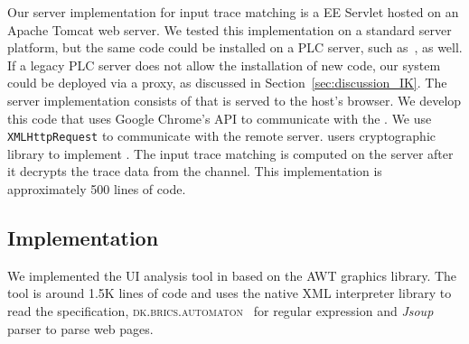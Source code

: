 Our server implementation for input trace matching is a \java EE Servlet hosted on an Apache Tomcat web server. We tested this implementation on a standard server platform, but the same code could be installed on a PLC server, such as~\cite{controlbyweb,siemens,siemens2,schneider}, as well. If a legacy PLC server does not allow the installation of new code, our system could be deployed via a proxy, as discussed in Section~\ref{sec:discussion_IK}. The server implementation consists of \js that is served to the host's browser. We develop this \js code that uses Google Chrome's \webusb API to communicate with the \device. We use \texttt{XMLHttpRequest} to communicate with the remote server. \server users \java cryptographic library to implement \tls. The input trace matching is computed on the server after it decrypts the trace data from the \tls channel. This implementation is approximately 500 lines of code.


\subsection{\tool Implementation} 

We implemented the UI analysis tool in \java based on the \java AWT graphics library. The tool is around 1.5K lines of code and uses the \java native XML interpreter library to read the specification, \textsc{dk.brics.automaton}~\cite{brics} for regular expression and \emph{Jsoup} \html parser to parse web pages. 



